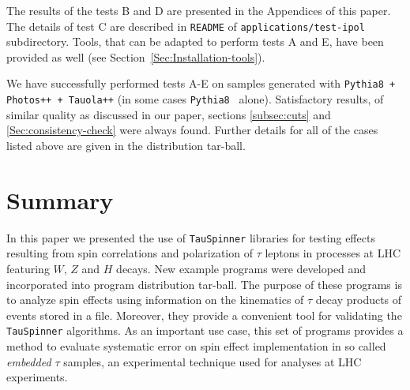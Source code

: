 \documentclass{article}
\begin{document}
The results of the tests B and D are presented in the Appendices of this paper.
The details of test C are described in {\tt README} of {\tt applications/test-ipol} subdirectory.
Tools, that can be adapted to perform tests A and E, have been provided as well (see Section~\ref{Sec:Installation-tools}).

We have successfully performed tests A-E on samples generated with {\tt Pythia8 + Photos++ + Tauola++} (in some cases  {\tt Pythia8 } alone). 
Satisfactory results, of similar quality as discussed in our paper, sections \ref{subsec:cuts} and \ref{Sec:consistency-check} were always found.
Further details for all of the cases listed above are given in the distribution tar-ball.

\newpage
\section{Summary} \label{Sec:Summary}

In this paper we presented the use of {\tt TauSpinner} libraries for testing effects resulting from spin correlations 
and polarization of $\tau$ leptons in processes at LHC featuring $W$, $Z$ and $H $ decays.
New example  programs  were developed and incorporated into program distribution tar-ball. 
The purpose of
these  programs is to analyze spin effects using information on the kinematics of  $\tau$ decay 
products of events  
stored in a file. Moreover, they provide a convenient tool for  
validating the {\tt TauSpinner} algorithms. As an important use case, this set of programs
provides a method to evaluate systematic error on spin effect
implementation in so called {\it embedded $\tau$} samples, an experimental technique used for 
analyses at LHC experiments.
\end{document}
